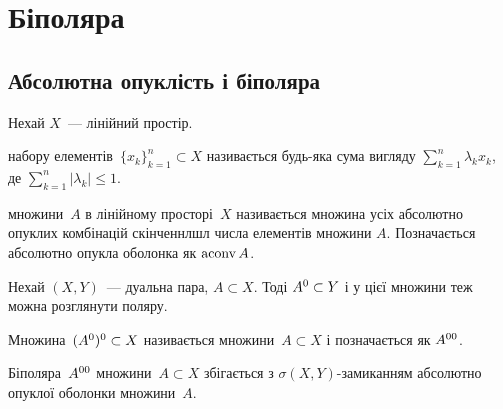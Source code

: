 \chapter{Біполяра}

\section{Абсолютна опуклість і біполяра}

\begin{definition}
    Нехай $X$~--- лінійний простір.
    
     набору елементів~$\{x_k\}_{k = 1}^n \subset X$ називається будь-яка сума вигляду $\sum_{k = 1}^n \lambda_k x_k$, де $\sum_{k = 1}^n |\lambda_k| \le 1$.
\end{definition}

\begin{definition}
     множини~$A$ в лінійному просторі~$X$ називається множина усіх абсолютно опуклих комбінацій скінченнлшл числа елементів множини $A$. Позначається абсолютно опукла оболонка як $\operatorname{aconv} A$.
\end{definition}

Нехай $(X, Y)$~--- дуальна пара, $A \subset X$. Тоді $A^0 \subset Y$ і у цієї множини теж можна розглянути поляру.

\begin{definition}
    Множина~$(A^0)^0 \subset X$ називається  множини~$A \subset X$ і позначається як $A^{00}$.
\end{definition}

\begin{theorem}
    Біполяра~$A^{00}$ множини~$A \subset X$ збігається з $\sigma(X, Y)$-замиканням абсолютно опуклої оболонки множини~$A$.
\end{theorem}

